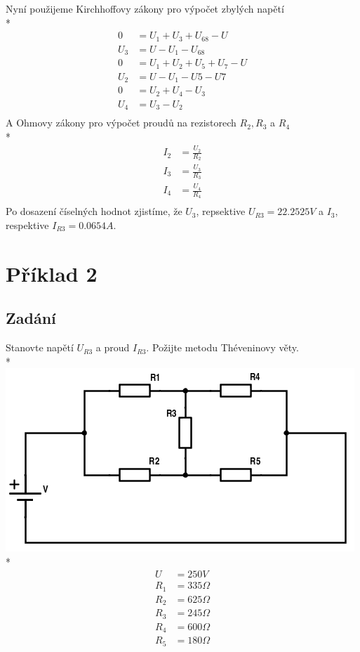\documentclass[a4paper, 10pt, fleqn]{article}
\begin{document}
 Nyní použijeme Kirchhoffovy zákony pro výpočet zbylých napětí \\*
\begin{align*}
 0 &= U_{1} + U_{3} + U_{68} - U \\
 U_{3} &= U - U_{1} - U_{68} \\
 0 &= U_{1} + U_{2} + U_{5} + U_{7} - U \\
 U_{2} &= U - U_{1} - U{5} - U{7} \\
 0 &= U_{2} + U_{4} - U_{3} \\
 U_{4} &= U_{3} - U_{2} \\
\end{align*}
 A Ohmovy zákony pro výpočet proudů na rezistorech $R_{2}, R_{3}$ a $R_{4}$ \\*
\begin{align*}
 I_{2} &= \frac{U_{2}}{R_{2}} \\
 I_{3} &= \frac{U_{3}}{R_{3}} \\
 I_{4} &= \frac{U_{4}}{R_{4}} \\
\end{align*}
Po dosazení číselných hodnot zjistíme, že $U_{3}$, repsektive $U_{R3} = 22.2525 V$ a
$I_{3}$, respektive $I_{R3} = 0.0654 A$.
\newpage
\section*{Příklad 2}
\subsection*{Zadání}
Stanovte napětí $U_{R3}$ a proud $I_{R3}$. Požijte metodu Théveninovy věty. \\*
\includegraphics[scale=0.8]{IEL_OBR/2a.png} \\*
\begin{align*}
 U &= 250 V \\
 R_{1} &= 335 \Omega \\
 R_{2} &= 625 \Omega \\
 R_{3} &= 245 \Omega \\
 R_{4} &= 600 \Omega \\
 R_{5} &= 180 \Omega \\
\end{align*}
\newpage
\end{document}
